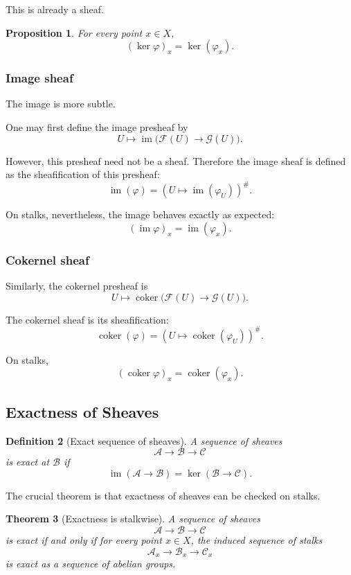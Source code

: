 \documentclass[12pt,a4paper]{article}
\DeclareMathOperator{\im}{im}
\DeclareMathOperator{\coker}{coker}
\newcommand{\F}{\mathcal F}
\newcommand{\G}{\mathcal G}
\theoremstyle{notespace}
\newtheorem{definition}{Definition}[subsection]
\newtheorem{theorem}[definition]{Theorem}
\newtheorem{proposition}[definition]{Proposition}
\newcommand{\B}{\mathcal B}
\newcommand{\C}{\mathcal C}
\newcommand{\A}{\mathcal A}
\begin{document}
This is already a sheaf.

\begin{proposition}
	For every point \(x\in X\),
	\[
	(\ker\varphi)_x=\ker(\varphi_x).
	\]
\end{proposition}

\subsubsection{Image sheaf}

The image is more subtle.

One may first define the image presheaf by
\[
U\longmapsto \im\bigl(\F(U)\to \G(U)\bigr).
\]

However, this presheaf need not be a sheaf. Therefore the image sheaf is defined as the sheafification of this presheaf:
\[
\im(\varphi)=
\left(
U\longmapsto \im(\varphi_U)
\right)^{\#}.
\]

On stalks, nevertheless, the image behaves exactly as expected:
\[
(\im\varphi)_x=\im(\varphi_x).
\]

\subsubsection{Cokernel sheaf}

Similarly, the cokernel presheaf is
\[
U\longmapsto \coker\bigl(\F(U)\to \G(U)\bigr).
\]

The cokernel sheaf is its sheafification:
\[
\coker(\varphi)=
\left(
U\longmapsto \coker(\varphi_U)
\right)^{\#}.
\]

On stalks,
\[
(\coker\varphi)_x=\coker(\varphi_x).
\]

\subsection{Exactness of Sheaves}

\begin{definition}[Exact sequence of sheaves]
	A sequence of sheaves
	\[
	\A\longrightarrow \B\longrightarrow \C
	\]
	is exact at \(\B\) if
	\[
	\im(\A\to \B)=\ker(\B\to \C).
	\]
\end{definition}

The crucial theorem is that exactness of sheaves can be checked on stalks.

\begin{theorem}[Exactness is stalkwise]
	A sequence of sheaves
	\[
	\A\longrightarrow \B\longrightarrow \C
	\]
	is exact if and only if for every point \(x\in X\), the induced sequence of stalks
	\[
	\A_x\longrightarrow \B_x\longrightarrow \C_x
	\]
	is exact as a sequence of abelian groups.
\end{theorem}
\end{document}

